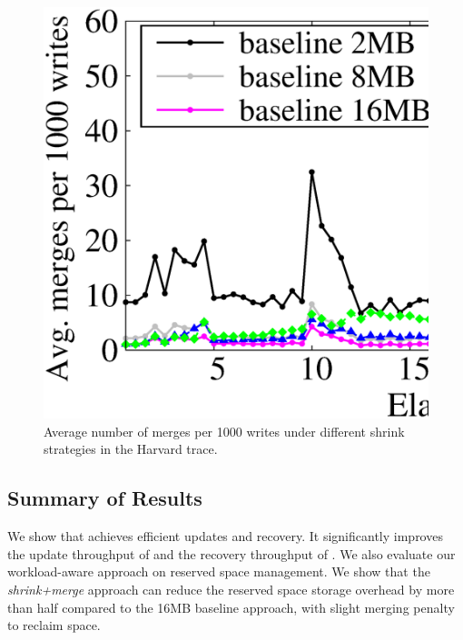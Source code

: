 \begin{figure}[t!]
    \centering
    \includegraphics[width=0.8\linewidth]{charts/harvard_merge/harvard_merge.eps}
    \caption{Average number of merges per 1000 writes under different shrink
        strategies in the Harvard trace.}
    \label{fig:harvard_merge}
\end{figure}

%

\subsection{Summary of Results}

We show that \PLR achieves efficient updates and recovery.  It significantly
improves the update throughput of \FO and the recovery throughput of \FL. 
We also evaluate our workload-aware approach on reserved space management. 
We show that the \textit{shrink+merge} approach can reduce the reserved space
storage overhead by more than half compared to the 16MB baseline approach, with
slight merging penalty to reclaim space.  

